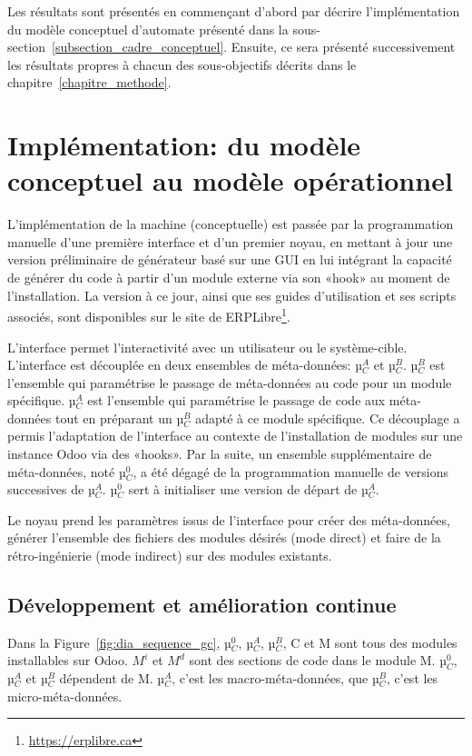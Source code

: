 \label{sec:Theme2}

Les résultats sont présentés en commençant d’abord par décrire l’implémentation du modèle conceptuel d’automate présenté dans la sous-section~\ref{subsection_cadre_conceptuel}. Ensuite, ce sera présenté successivement les résultats propres à chacun des sous-objectifs décrits dans le chapitre~\ref{chapitre_methode}.

\section{Implémentation: du modèle conceptuel au modèle opérationnel}

L’implémentation de la machine (conceptuelle) est passée par la programmation manuelle d’une première interface et d’un premier noyau, en mettant à jour une version préliminaire de générateur basé sur une GUI\cite{bluiksnot_repo} en lui intégrant la capacité de générer du code à partir d’un module externe via son «hook» au moment de l’installation. La version à ce jour, ainsi que ses guides d’utilisation et ses scripts associés, sont disponibles sur le site de ERPLibre\footnote{\url{https://erplibre.ca}}.

L’interface permet l’interactivité avec un utilisateur ou le système-cible. L’interface est découplée en deux ensembles de méta-données: µ$_C^A$ et µ$_C^B$. µ$_C^B$ est l’ensemble qui paramétrise le passage de méta-données au code pour un module spécifique. µ$_C^A$ est l’ensemble qui paramétrise le passage de code aux méta-données tout en préparant un µ$_C^B$ adapté à ce module spécifique. Ce découplage a permis l’adaptation de l’interface au contexte de l’installation de modules sur une instance Odoo via des «hooks». Par la suite, un ensemble supplémentaire de méta-données, noté µ$_C^0$, a été dégagé de la programmation manuelle de versions successives de µ$_C^A$. µ$_C^0$ sert à initialiser une version de départ de µ$_C^A$.

Le noyau prend les paramètres issus de l’interface pour créer des méta-données, générer l’ensemble des fichiers des modules désirés (mode direct) et faire de la rétro-ingénierie (mode indirect) sur des modules existants.

\subsection{Développement et amélioration continue}

Dans la Figure~\ref{fig:dia_sequence_gc}, µ$_C^0$, µ$_C^A$, µ$_C^B$, C et M sont tous des modules installables sur Odoo. $M^i$ et $M^d$ sont des sections de code dans le module M. µ$_C^0$, µ$_C^A$ et µ$_C^B$ dépendent de M. µ$_C^A$, c’est les macro-méta-données, que µ$_C^B$, c’est les micro-méta-données.

